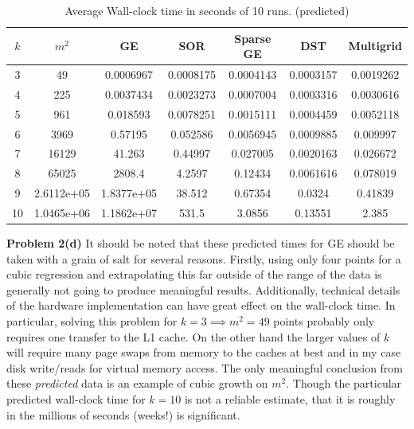 \documentclass[12pt]{article}
\newcommand{\problem}[1]{\hspace{-4 ex} \large \textbf{Problem #1} }
\begin{document}
\begin{table}[H]
	\caption{Average Wall-clock time in seconds of 10 runs. {\color{gray}(predicted)}}
	\begin{center}
		\begin{tabular}{|c|c|c|c|c|c|c|}
			\hline
			$k$&$m^2$&GE&SOR&Sparse GE&DST&Multigrid\\ \hline
			3&49&0.0006967&0.0008175&0.0004143&0.0003157&0.0019262\\ \hline
			4&225&0.0037434&0.0023273&0.0007004&0.0003316&0.0030616\\ \hline
			5&961&0.018593&0.0078251&0.0015111&0.0004459&0.0052118\\ \hline
			6&3969&0.57195&0.052586&0.0056945&0.0009885&0.009997\\ \hline
			7&16129&\color{gray}41.263&0.44997&0.027005&0.0020163&0.026672\\ \hline
			8&65025&\color{gray}2808.4&4.2597&0.12434&0.0061616&0.078019\\ \hline
			9&2.6112e+05&\color{gray}1.8377e+05&38.512&0.67354&0.0324&0.41839\\ \hline
			10&1.0465e+06&\color{gray}1.1862e+07&531.5&3.0856&0.13551&2.385\\ \hline
		\end{tabular}
	\end{center}
\end{table}

\bigbreak
\problem{2(d)} It should be noted that these predicted times for GE should be taken with a grain of salt for several reasons. Firstly, using only four points for a cubic regression and extrapolating this far outside of the range of the data is generally not going to produce meaningful results. Additionally, technical details of the hardware implementation can have great effect on the wall-clock time. In particular, solving this problem for $k=3 \implies m^2 = 49$ points probably only requires one transfer to the L1 cache. On the other hand the larger values of $k$ will require many page swaps from memory to the caches at best and in my case disk write/reads for virtual memory access. The only meaningful conclusion from these \textit{predicted} data is an example of cubic growth on $m^2$. Though the particular predicted wall-clock time for $k=10$ is not a reliable estimate, that it is roughly in the millions of seconds (weeks!) is significant. \bigbreak
\end{document}

